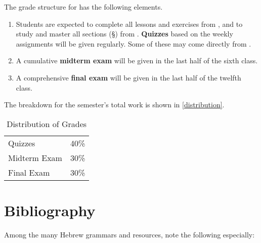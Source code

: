 \documentclass[titlepage]{article}
\newcommand\policy{../policy}
\begin{document}
The grade structure for \ccode has the following elements.

\begin{enumerate}
 \item
    Students are expected to complete all lessons and exercises from
    \cite{bbh}, and to study and master all sections (\S) from
    \cite{tm}. \textbf{Quizzes} based on the weekly assignments will be
    given regularly. Some of these may come directly from \cite{bbh}.
 \item
   A cumulative \textbf{midterm exam} will be given in the last half of
   the sixth class.
 \item
   A comprehensive \textbf{final exam} will be given in the last half of
   the twelfth class.
\end{enumerate}

The breakdown for the semester's total work is shown in
\autoref{distribution}.

\begin{table}[htbp]
  \centering
  {\lining
  \begin{tabular}{lr}
    \toprule
    Quizzes      & 40\% \\
    Midterm Exam & 30\% \\
    Final Exam   & 30\% \\
    \bottomrule
  \end{tabular}}
  \caption{Distribution of Grades}
  \label{distribution}
\end{table}





\section{Bibliography}
\label{bib}

Among the many Hebrew grammars and resources, note the following
especially:
\end{document}
